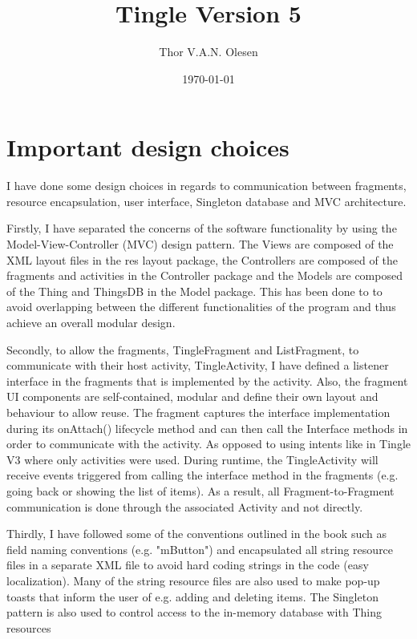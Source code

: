 \documentclass{article}
\title{Tingle Version 5}
\date{\today}
\author{Thor V.A.N. Olesen}
\begin{document}
\maketitle

\section{Important design choices}

I have done some design choices in regards to communication between fragments, resource encapsulation, user interface, Singleton database and MVC architecture. \newline

\noindent Firstly, I have separated the concerns of the software functionality by using the Model-View-Controller (MVC) design pattern. The Views are composed of the XML layout files in the res layout package, the Controllers are composed of the fragments and activities in the Controller package and the Models are composed of the Thing and ThingsDB in the Model package. This has been done to to avoid overlapping between the different functionalities of the program and thus achieve an overall modular design. \newline

\noindent Secondly, to allow the fragments, TingleFragment and ListFragment, to communicate with their host activity, TingleActivity, I have defined a listener interface in the fragments that is implemented by the activity. Also, the fragment UI components are self-contained, modular and define their own layout and behaviour to allow reuse. The fragment captures the interface implementation during its onAttach() lifecycle method and can then call the Interface methods in order to communicate with the activity. As opposed to using intents like in Tingle V3 where only activities were used. During runtime, the TingleActivity will receive events triggered from calling the interface method in the fragments (e.g. going back or showing the list of items). As a result, all Fragment-to-Fragment communication is done through the associated Activity and not directly. \newline

\noindent Thirdly, I have followed some of the conventions outlined in the book such as field naming conventions (e.g. "mButton") and encapsulated all string resource files in a separate XML file to avoid hard coding strings in the code (easy localization). Many of the string resource files are also used to make pop-up toasts that inform the user of e.g. adding and deleting items. The Singleton pattern is also used to control access to the in-memory database with Thing resources
\end{document}
